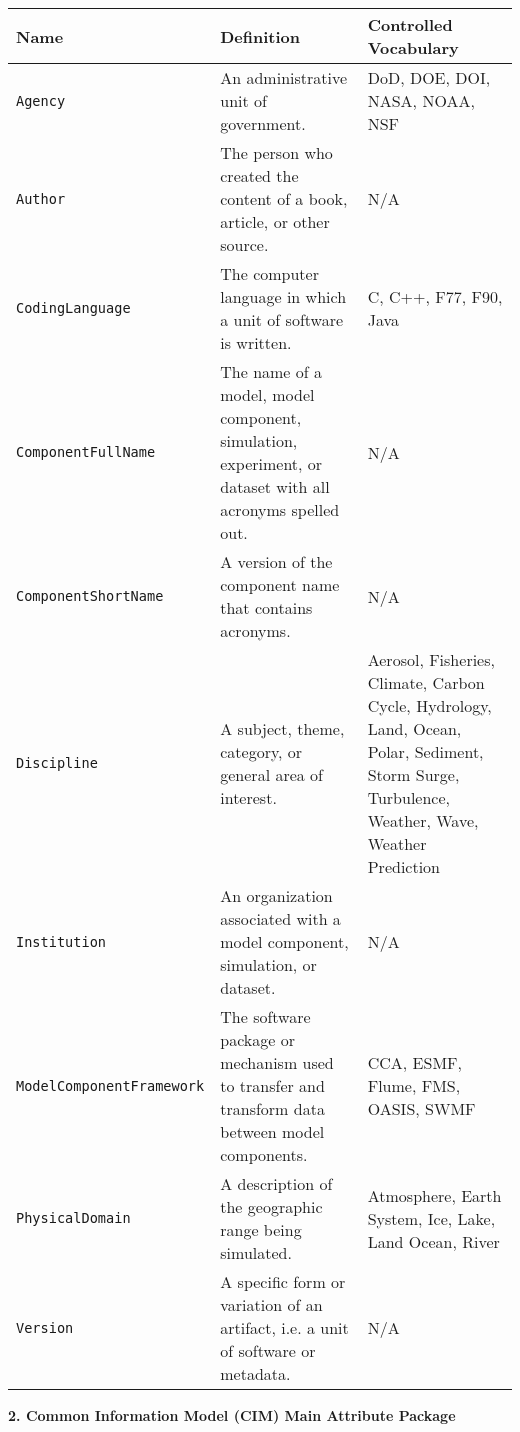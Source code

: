 \begin{tabular}{|p{8cm}|p{20cm}|p{10cm}}
     \hline\hline
     {\bf Name} & {\bf Definition} & {\bf Controlled Vocabulary}\\
     \hline\hline
     {\tt Agency} & An administrative unit of government.& DoD, DOE, DOI, NASA, NOAA, NSF\\
     {\tt Author} & The person who created the content of a book, article, or other source. & N/A\\
     {\tt CodingLanguage} & The computer language in which a unit of software is written. & C, C++, F77, F90, Java\\
     {\tt ComponentFullName} & The name of a model, model component, simulation, experiment, or dataset with all acronyms spelled out. & N/A\\
     {\tt ComponentShortName} & A version of the component name that contains acronyms. & N/A\\
     {\tt Discipline} & A subject, theme, category, or general area of interest.& Aerosol, Fisheries, Climate, Carbon Cycle, Hydrology, Land, Ocean, Polar, Sediment, Storm Surge, Turbulence, Weather, Wave, Weather Prediction \\
     {\tt Institution} & An organization associated with a model component, simulation, or dataset.& N/A\\
     {\tt ModelComponentFramework} & The software package or mechanism used to transfer and transform data between model components.& CCA, ESMF, Flume, FMS, OASIS, SWMF \\
     {\tt PhysicalDomain} & A description of the geographic range being simulated. & Atmosphere, Earth System, Ice, Lake, Land Ocean, River\\
     {\tt Version} & A specific form or variation of an artifact, i.e. a unit of software or metadata. & N/A\\ 
\end{tabular}



\vspace{.20in}
{\bf 2. Common Information Model (CIM) Main Attribute Package}

